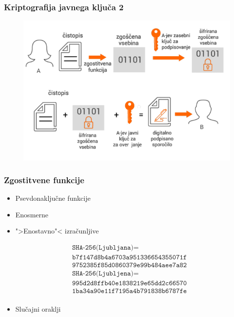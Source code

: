 \documentclass{beamer}    %
\begin{document}
\begin{frame}
    \frametitle{Kriptografija javnega ključa 2}
    \begin{figure}
        \includegraphics[width=\textwidth]{images/podpisovanje.png}
    \end{figure}
\end{frame}

\begin{frame}
    \frametitle{Zgostitvene funkcije}
    \begin{itemize}
        \item Psevdonaključne funkcije
        \item Enosmerne
        \item ">Enostavno"< izračunljive
    \end{itemize}
    \begin{align*}
        &\texttt{SHA-256(Ljubljana)} = \\
        &\texttt{b7f147d8b4a6703a951336654355071f} \\ 
        &\texttt{9752385f85d0860379e99b484aee7a82} \\
        &\texttt{SHA-256(Ljubljena)} = \\
        &\texttt{995d2d8ffb40e1838219e65dd2c66570} \\
        &\texttt{1ba34a90e11f7195a4b791838b6787fe} \\ 
    \end{align*}
    \begin{itemize}
        \item Slučajni oraklji
    \end{itemize}
\end{frame}
\end{document}
